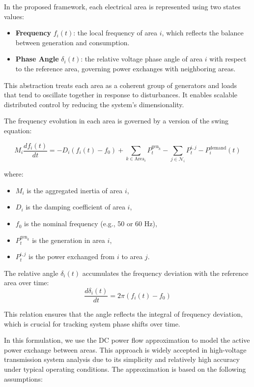 \documentclass{article}
\begin{document}
In the proposed framework, each electrical area is represented using two states values:

\begin{itemize}
    \item \textbf{Frequency} $f_i(t)$: the local frequency of area $i$, which reflects the balance between generation and consumption.
    \item \textbf{Phase Angle} $\delta_i(t)$: the relative voltage phase angle of area $i$ with respect to the reference area, governing power exchanges with neighboring areas.
\end{itemize}

This abstraction treats each area as a coherent group of generators and loads that tend to oscillate together in response to disturbances. It enables scalable distributed control by reducing the system's dimensionality.

The frequency evolution in each area is governed by a version of the swing equation:

\begin{equation}
    M_i \frac{df_i(t)}{dt} = -D_i(f_i(t) - f_0) + \sum_{k \in \text{Area}_i} P^{\text{gen}_k}_{t} - \sum_{j \in \mathcal{N}_i} P^{i,j}_t - P^{\text{demand}}_i(t)
\end{equation}

where:
\begin{itemize}
    \item $M_i$ is the aggregated inertia of area $i$,
    \item $D_i$ is the damping coefficient of area $i$,
    \item $f_0$ is the nominal frequency (e.g., 50 or 60 Hz),
    \item $P^{\text{gen}_k}_t$ is the generation in area $i$,
    \item $P^{i,j}_t$ is the power exchanged from $i$ to area $j$.
\end{itemize}

The relative angle $\delta_i(t)$ accumulates the frequency deviation with the reference area over time:
\begin{equation}
    \frac{d\delta_i(t)}{dt} = 2\pi(f_i(t) - f_0)
\end{equation}

This relation ensures that the angle reflects the integral of frequency deviation, which is crucial for tracking system phase shifts over time. 


In this formulation, we use the DC power flow approximation to model the active power exchange between areas. This approach is widely accepted in high-voltage transmission system analysis due to its simplicity and relatively high accuracy under typical operating conditions. The approximation is based on the following assumptions:
\end{document}
